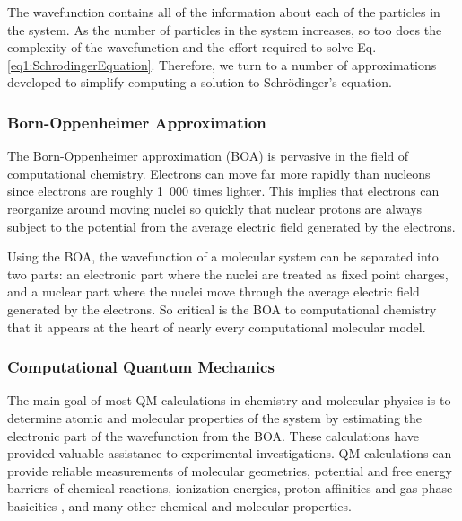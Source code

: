 The wavefunction contains all of the information about each of the particles in
the system. As the number of particles in the system increases, so too does the
complexity of the wavefunction and the effort required to solve Eq.
\ref{eq1:SchrodingerEquation}. Therefore, we turn to a number of approximations
developed to simplify computing a solution to Schr\"odinger's equation.

\subsubsection{Born-Oppenheimer Approximation}

The Born-Oppenheimer approximation (BOA) is pervasive in the field of
computational chemistry. Electrons can move far more rapidly than nucleons since
electrons are roughly \mbox{1 000} times lighter. This implies that electrons
can reorganize around moving nuclei so quickly that nuclear protons are always
subject to the potential from the average electric field generated by the
electrons.

Using the BOA, the wavefunction of a molecular system can be separated into two
parts: an electronic part where the nuclei are treated as fixed point charges,
and a nuclear part where the nuclei move through the average electric field
generated by the electrons.  \cite{McQuarrie_Book_PhysChem_1997} So critical is
the BOA to computational chemistry that it appears at the heart of nearly every
computational molecular model.

\subsubsection{Computational Quantum Mechanics}
\label{sec1:CompQuantumMech}

The main goal of most QM calculations in chemistry and molecular physics is to
determine atomic and molecular properties of the system by estimating the
electronic part of the wavefunction from the BOA. These calculations have
provided valuable assistance to experimental investigations. QM calculations
can provide reliable measurements of molecular geometries,
\cite{Jeletic_JOrganometChem_2011_v696_p3127} potential and free energy barriers
of chemical reactions, \cite{Chandrasekhar_JAmChemSoc_1985_v107_p154} ionization
energies, \cite{Watson_ChemPhysLett_2013_v555_p235} proton affinities and
gas-phase basicities \cite{Range_PhysChemChemPhys_2005_v7_p3070}, and many other
chemical and molecular properties. \cite{Hehre_Ab_inito_MO_Theory_Book_1986}

